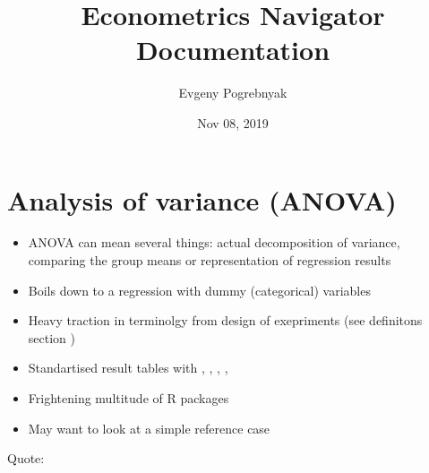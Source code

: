\documentclass[letterpaper,10pt,english]{sphinxmanual}
\title{Econometrics Navigator Documentation}
\date{Nov 08, 2019}
\author{Evgeny Pogrebnyak}
\begin{document}
\pagestyle{empty}
\sphinxmaketitle
\pagestyle{plain}
\sphinxtableofcontents
\pagestyle{normal}
\label{\detokenize{index::doc}}



\chapter{Analysis of variance (ANOVA)}
\label{\detokenize{topics/anova:analysis-of-variance-anova}}\label{\detokenize{topics/anova::doc}}\begin{itemize}
\item {} 
ANOVA can mean several things: actual decomposition of variance, comparing the group means or representation of regression results

\item {} 
Boils down to a regression with dummy (categorical) variables

\item {} 
Heavy traction in terminolgy from design of exepriments (see definitons section )

\item {} 
Standartised result tables with , , , , 

\item {} 
Frightening multitude of R packages

\item {} 
May want to look at a simple reference case 

\end{itemize}

Quote:
\begin{quote}

 
\end{quote}
\end{document}
